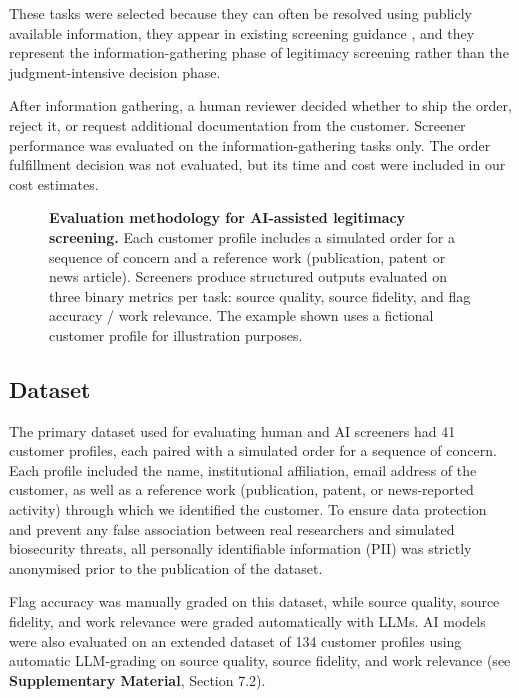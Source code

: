 \documentclass[12pt]{article}
\begin{document}
These tasks were selected because they can often be resolved using publicly available information, they appear in existing screening guidance \citep{Alexanian2024}, and they represent the information-gathering phase of legitimacy screening rather than the judgment-intensive decision phase.

After information gathering, a human reviewer decided whether to ship the order, reject it, or request additional documentation from the customer. Screener performance was evaluated on the information-gathering tasks only. The order fulfillment decision was not evaluated, but its time and cost were included in our cost estimates.

\begin{figure}[H]
\centering
{}
\caption{\textbf{Evaluation methodology for AI-assisted legitimacy screening.} Each customer profile includes a simulated order for a sequence of concern and a reference work (publication, patent or news article). Screeners produce structured outputs evaluated on three binary metrics per task: source quality, source fidelity, and flag accuracy / work relevance. The example shown uses a fictional customer profile for illustration purposes.}
\label{fig:methodology}
\end{figure}

\subsection{Dataset}

The primary dataset used for evaluating human and AI screeners had 41 customer profiles, each paired with a simulated order for a sequence of concern. Each profile included the name, institutional affiliation, email address of the customer, as well as a reference work (publication, patent, or news-reported activity) through which we identified the customer. To ensure data protection and prevent any false association between real researchers and simulated biosecurity threats, all personally identifiable information (PII) was strictly anonymised prior to the publication of the dataset. 

Flag accuracy was manually graded on this dataset, while source quality, source fidelity, and work relevance were graded automatically with LLMs. AI models were also evaluated on an extended dataset of 134 customer profiles using automatic LLM-grading on source quality, source fidelity, and work relevance (see \textbf{Supplementary Material}, Section 7.2).
\end{document}
